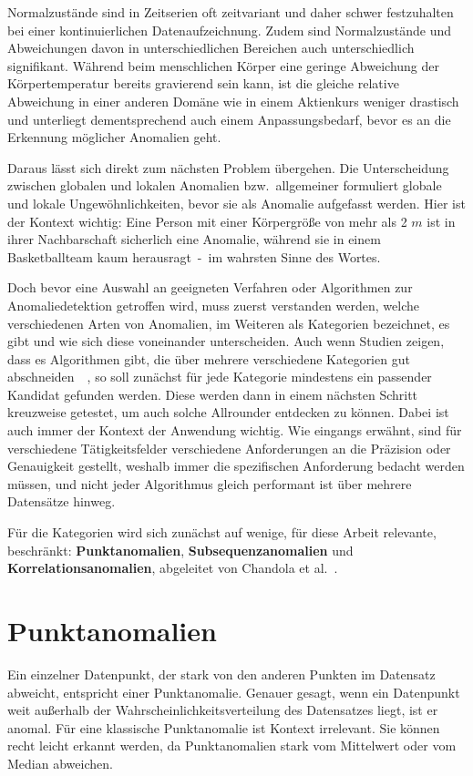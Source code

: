 Normalzustände sind in Zeitserien oft zeitvariant und daher schwer festzuhalten bei einer kontinuierlichen Datenaufzeichnung.
Zudem sind Normalzustände und Abweichungen davon in unterschiedlichen Bereichen auch unterschiedlich signifikant. Während beim
menschlichen Körper eine geringe Abweichung der Körpertemperatur bereits gravierend sein kann, ist die gleiche relative Abweichung
in einer anderen Domäne wie in einem Aktienkurs weniger drastisch und unterliegt dementsprechend auch einem Anpassungsbedarf, bevor
es an die Erkennung möglicher Anomalien geht.

Daraus lässt sich direkt zum nächsten Problem übergehen. Die Unterscheidung zwischen globalen und lokalen Anomalien bzw.~allgemeiner
formuliert globale und lokale Ungewöhnlichkeiten, bevor sie als Anomalie aufgefasst werden. Hier ist der Kontext wichtig: Eine Person
mit einer Körpergröße von mehr als 2 $m$ ist in ihrer Nachbarschaft sicherlich eine Anomalie, während sie in einem Basketballteam
kaum herausragt~-~im wahrsten Sinne des Wortes.

Doch bevor eine Auswahl an geeigneten Verfahren oder Algorithmen zur Anomaliedetektion getroffen wird, muss zuerst verstanden werden,
welche verschiedenen Arten von Anomalien, im Weiteren als Kategorien bezeichnet, es gibt und wie sich diese voneinander unterscheiden.
Auch wenn Studien zeigen, dass es Algorithmen gibt, die über mehrere verschiedene Kategorien gut
abschneiden~\cite[S.~30~-~31]{Wenig2024}~\cite{Schmidl2022}, so soll zunächst für jede Kategorie mindestens ein passender Kandidat
gefunden werden. Diese werden dann in einem nächsten Schritt kreuzweise getestet, um auch solche Allrounder entdecken zu können. Dabei
ist auch immer der Kontext der Anwendung wichtig. Wie eingangs erwähnt, sind für verschiedene Tätigkeitsfelder verschiedene
Anforderungen an die Präzision oder Genauigkeit gestellt, weshalb immer die spezifischen Anforderung bedacht werden müssen, und nicht
jeder Algorithmus gleich performant ist über mehrere Datensätze hinweg.

Für die Kategorien wird sich zunächst auf wenige, für diese Arbeit relevante, beschränkt: \textbf{Punkt\-anomalien},
\textbf{Subsequenzanomalien} und \textbf{Korrelationsanomalien}, abgeleitet von Chandola et al.~\cite{Chandola2009}.

\section{Punktanomalien}
Ein einzelner Datenpunkt, der stark von den anderen Punkten im Datensatz abweicht, entspricht einer Punktanomalie. Genauer gesagt,
wenn ein Datenpunkt weit außerhalb der Wahrscheinlichkeitsverteilung des Datensatzes liegt, ist er anomal. Für eine klassische
Punktanomalie ist Kontext irrelevant. Sie können recht leicht erkannt werden, da Punktanomalien stark vom Mittelwert oder vom Median
abweichen.

